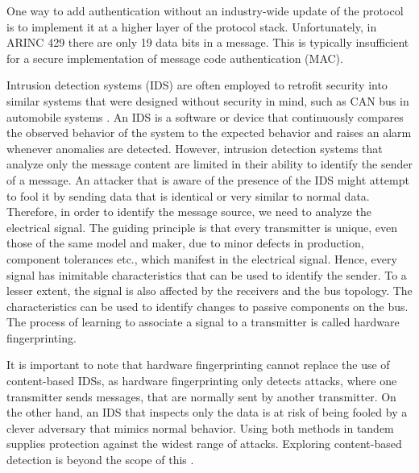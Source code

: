 \documentclass[compsoc,conference,a4paper,10pt,times]{IEEEtran}
\newcommand{\sublevel}[1]{\subsection{#1}}
\newcommand{\sublevel}[1]{\section{#1}}
\begin{document}
  One way to add authentication without an industry-wide update of the protocol is to implement it at a higher layer of the protocol stack. Unfortunately, in ARINC 429 there are only 19 data bits in a message. This is typically insufficient for a secure implementation of message code authentication (MAC).
  
  Intrusion detection systems (IDS) are often employed to retrofit security into similar systems that were designed without security in mind, such as CAN bus in automobile systems \cite{muter2011entropy}. An IDS is a software or device that continuously compares the observed behavior of the system to the expected behavior and raises an alarm whenever anomalies are detected. However, intrusion detection systems that analyze only the message content are limited in their ability to identify the sender of a message.  An attacker that is aware of the presence of the IDS might attempt to fool it by sending data that is identical or very similar to normal data.  Therefore, in order to identify the message source, we need to analyze the electrical signal. The guiding principle is that every transmitter is unique, even those of the same model and maker, due to minor defects in production, component tolerances etc., which manifest in the electrical signal. Hence, every signal has inimitable characteristics that can be used to identify the sender. To a lesser extent, the signal is also affected by the receivers and the bus topology. The characteristics can be used to identify changes to passive components on the bus. The process of learning to associate a signal to a transmitter is called hardware fingerprinting.
  
  It is important to note that hardware fingerprinting cannot replace the use of content-based IDSs, as hardware fingerprinting only detects attacks, where one transmitter sends messages, that are normally sent by another transmitter. On the other hand, an IDS that inspects only the data is at risk of being fooled by a clever adversary that mimics normal behavior. Using both methods in tandem supplies protection against the widest range of attacks. Exploring content-based detection is beyond the scope of this \iftoggle{paper} {paper} {work}.
  
\end{document}
